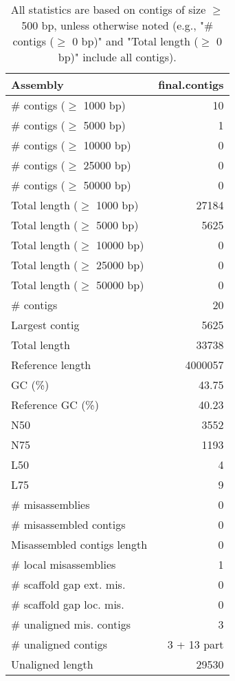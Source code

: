 \documentclass[12pt,a4paper]{article}
\begin{document}
\begin{table}[ht]
\begin{center}
\caption{All statistics are based on contigs of size $\geq$ 500 bp, unless otherwise noted (e.g., "\# contigs ($\geq$ 0 bp)" and "Total length ($\geq$ 0 bp)" include all contigs).}
\begin{tabular}{|l*{1}{|r}|}
\hline
Assembly & final.contigs \\ \hline
\# contigs ($\geq$ 1000 bp) & 10 \\ \hline
\# contigs ($\geq$ 5000 bp) & 1 \\ \hline
\# contigs ($\geq$ 10000 bp) & 0 \\ \hline
\# contigs ($\geq$ 25000 bp) & 0 \\ \hline
\# contigs ($\geq$ 50000 bp) & 0 \\ \hline
Total length ($\geq$ 1000 bp) & 27184 \\ \hline
Total length ($\geq$ 5000 bp) & 5625 \\ \hline
Total length ($\geq$ 10000 bp) & 0 \\ \hline
Total length ($\geq$ 25000 bp) & 0 \\ \hline
Total length ($\geq$ 50000 bp) & 0 \\ \hline
\# contigs & 20 \\ \hline
Largest contig & 5625 \\ \hline
Total length & 33738 \\ \hline
Reference length & 4000057 \\ \hline
GC (\%) & 43.75 \\ \hline
Reference GC (\%) & 40.23 \\ \hline
N50 & 3552 \\ \hline
N75 & 1193 \\ \hline
L50 & 4 \\ \hline
L75 & 9 \\ \hline
\# misassemblies & 0 \\ \hline
\# misassembled contigs & 0 \\ \hline
Misassembled contigs length & 0 \\ \hline
\# local misassemblies & 1 \\ \hline
\# scaffold gap ext. mis. & 0 \\ \hline
\# scaffold gap loc. mis. & 0 \\ \hline
\# unaligned mis. contigs & 3 \\ \hline
\# unaligned contigs & 3 + 13 part \\ \hline
Unaligned length & 29530 \\ \hline

\end{tabular}
\end{center}
\end{table}
\end{document}
